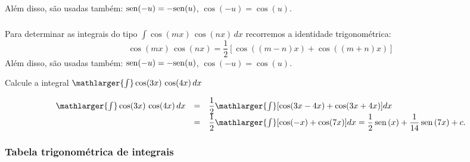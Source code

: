 \cleardoublepage\documentclass[../main.tex]{subfiles}
\begin{document}
Além disso, são usadas também: \({\rm sen}(-u)=-{\rm sen}(u)\), \(\cos(-u)=\cos(u)\).
\subsubsection[\formula{Integrais do tipo $\int  \cos(mx)\,\cos(nx)\,dx$}]{}
Para determinar as integrais do tipo $\int  \cos(mx)\,\cos(nx)\,dx$ recorremos a identidade trigonométrica:
\begin{equation}
   \cos(mx)\,\cos(nx)= \dfrac{1}{2}\left[ \cos((m-n)x) +\cos((m+n)x)\right]
\end{equation}
Além disso, são usadas também: \({\rm sen}(-u)=-{\rm sen}(u)\), \(\cos(-u)=\cos(u)\).
\begin{ex}
Calcule a integral \(\mathlarger{\int} \cos(3x)\,\cos (4x)\,dx\)

\begin{solution}
\[ \begin{array}{rcl} \mathlarger{\int} \cos (3x)\,\cos (4x)\,dx &=&\dfrac{1}{2} \mathlarger{\int} [\cos(3x-4x) + \cos(3x+4x)]dx \\ &=&\dfrac{1}{2} \mathlarger{\int} [\cos(-x) + \cos(7x)]dx = \dfrac{1}{2} \sen(x) +\dfrac{1}{14}\sen(7x) +c. \end{array} \]
\end{solution}
\end{ex}
\newpage
\subsubsection{Tabela trigonométrica de integrais}
\end{document}
